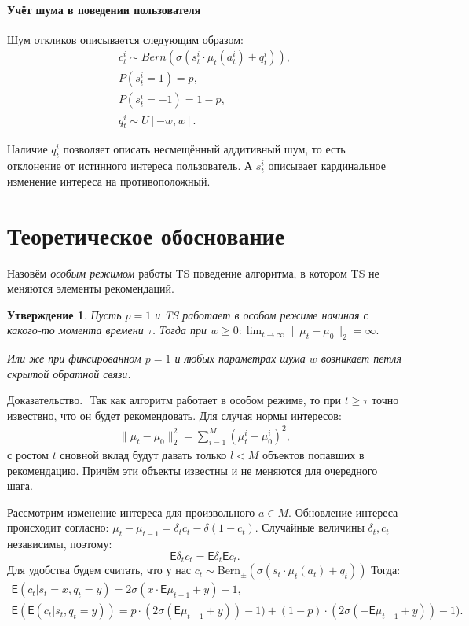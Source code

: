 \documentclass[12pt, twoside]{article}
\newtheorem{statement}{Утверждение}
\begin{document}
\paragraph{Учёт шума в поведении пользователя}
Шум откликов описываeтся следующим образом: 
\begin{gather*}
  c_t^i \sim Bern \left(\sigma(s_t^i \cdot \mu_t(a_t^i) + q_t^i) \right), \\
  P(s_t^i = 1) = p, \\ P(s_t^i = -1) = 1 - p, \\
  q_t^i \sim U[-w, w].
\end{gather*}

Наличие $q_t^i$ позволяет описать несмещённый аддитивный шум, то есть отклонение от истинного интереса пользователь. А $s_t^i$ описывает кардинальное изменение интереса на противоположный. 


\section{Теоретическое обоснование}
Назовём \textit{особым режимом} работы TS поведение алгоритма, в котором TS не меняются элементы рекомендаций.

\begin{statement}
  Пусть  $p=1$ и TS работает в особом режиме начиная с какого-то момента времени $\tau$. Тогда при $w \geq 0 : \lim_{t \to \infty} \|\mu_t - \mu_0 \|_2 = \infty.$

  Или же при фиксированном $ p = 1$ и любых параметрах шума $w$ возникает петля скрытой обратной связи. 
\end{statement}
$\textbf{Доказательство. }$ 
Так как алгоритм работает в особом режиме, то при $t \geq \tau$ точно извествно, что он будет рекомендовать.
Для случая нормы интересов: 
\begin{gather*}
  \|\mu_t - \mu_0 \|^2_2 = \sum_{i=1}^M (\mu_t^i - \mu_0^i)^2,
\end{gather*}
с ростом $t$ сновной вклад будут давать только $l < M$ объектов попавших в рекомендацию. 
Причём эти объекты известны и не меняются для очередного шага. 

Рассмотрим изменение интереса для произвольного $a \in M$. 
Обновление интереса происходит согласно: $\mu_t - \mu_{t-1} = \delta_t c_t - \delta (1 - c_t)$.
Случайные величины $\delta_t, c_t$ независимы, поэтому: \[\mathsf{E} \delta_t c_t = \mathsf{E} \delta_t \mathsf{E} c_t.\] 
Для удобства будем считать, что у нас $c_t \sim \text{Bern}_{\pm}(\sigma(s_t \cdot \mu_t(a_t) + q_t))$
Тогда: 
\begin{gather*}
  \mathsf{E} (c_t | s_t = x, q_t = y) = 2 \sigma(x \cdot \mathsf{E} \mu_{t-1} + y) - 1, \\
  \mathsf{E} (\mathsf{E} (c_t | s_t, q_t = y)) = p \cdot (2 \sigma(\mathsf{E} \mu_{t-1} + y)) - 1) +  (1-p) \cdot (2 \sigma(- \mathsf{E}\mu_{t-1} + y)) - 1).  
\end{gather*}
\end{document}
